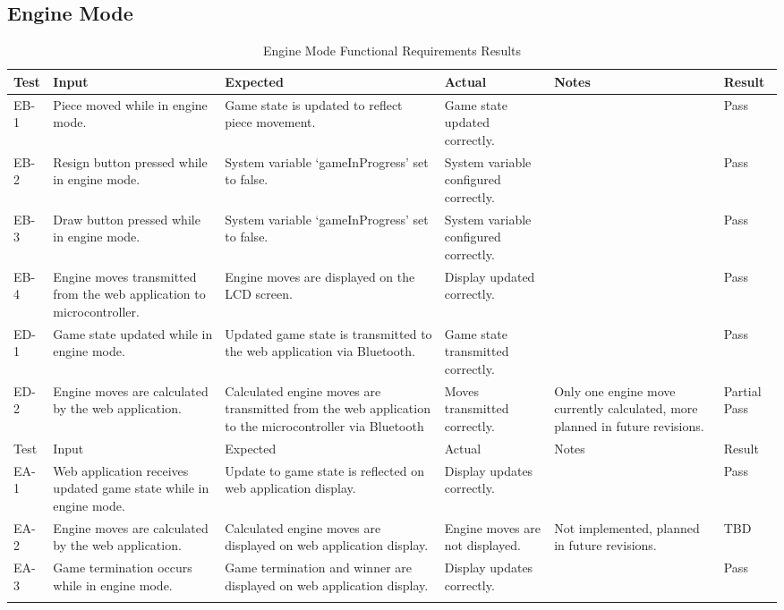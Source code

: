 \documentclass[12pt, titlepage]{article}
\begin{document}
\subsection{Engine Mode}
    \begin{longtable}{| >{\centering\arraybackslash}m{1cm} | 
        >{\centering\arraybackslash}m{2.5cm} | 
        >{\centering\arraybackslash}m{4cm} | 
        >{\centering\arraybackslash}m{3cm} |
        >{\centering\arraybackslash}m{3cm} |
        >{\centering\arraybackslash}m{1.5cm} |}
    \hline
    \rowcolor[gray]{0.9}
    Test & Input & Expected & Actual & Notes & Result\\
    \hline
    EB-1 & Piece moved while in engine mode. & Game state is updated to reflect piece movement. & Game state updated correctly. &  & Pass \\
    \hline
    EB-2 & Resign button pressed while in engine mode. & System variable `gameInProgress' set to false. & System variable configured correctly. &  & Pass \\
    \hline
    EB-3 & Draw button pressed while in engine mode. & System variable `gameInProgress' set to false. & System variable configured correctly. &  & Pass \\
    \hline
    EB-4 & Engine moves transmitted from the web application to microcontroller. & Engine moves are displayed on the LCD screen. & Display updated correctly. &  & Pass \\
    \hline
    ED-1 & Game state updated while in engine mode. & Updated game state is transmitted to the web application via Bluetooth. & Game state transmitted correctly. &  & Pass \\
    \hline
    ED-2 & Engine moves are calculated by the web application. & Calculated engine moves are transmitted from the web application to the microcontroller via Bluetooth & Moves transmitted correctly. & Only one engine move currently calculated, more planned in future revisions. & Partial Pass \\
    \hline
    \pagebreak 
    \hline
    \rowcolor[gray]{0.9}
    Test & Input & Expected & Actual & Notes & Result\\
    \hline
    EA-1 & Web application receives updated game state while in engine mode. & Update to game state is reflected on web application display. & Display updates correctly. &  & Pass \\
    \hline
    EA-2 & Engine moves are calculated by the web application. & Calculated engine moves are displayed on web application display. & Engine moves are not displayed. & Not implemented, planned in future revisions. & TBD \\
    \hline
    EA-3 & Game termination occurs while in engine mode. & Game termination and winner are displayed on web application display. & Display updates correctly. &  & Pass \\
    \hline
    \caption{Engine Mode Functional Requirements Results}\\
\end{longtable}
\end{document}
